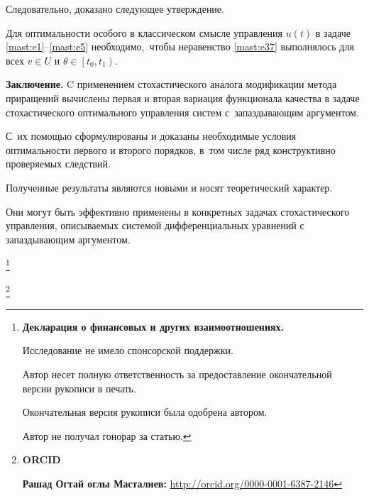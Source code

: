 Следовательно, доказано следующее утверждение.



\smallskip



\begin{theorem}[4]Для оптимальности особого в классическом смысле управления $ u(t) $ в задаче \eqref{mast:e1}--\eqref{mast:e5}  необходимо$,$ чтобы неравенство  \eqref{mast:e37}  выполнялось  для всех  $ v \in U $ и $ \theta \in \left[ t_{0}, t_{1} \right)  .$

\end{theorem}



\smallskip



 

\textbf{Заключение.} C применением стохастического аналога модификации метода приращений вычислены первая и вторая вариация функционала качества в задаче стохастического оптимального управления систем с~запаздывающим аргументом. 

С~их помощью сформулированы и доказаны необходимые условия оптимальности первого и второго порядков, в~том числе ряд конструктивно проверяемых следствий. 

Полученные результаты являются новыми и носят теоретический характер. 

Они могут быть эффективно применены в конкретных  задачах стохастического управления,  описываемых системой дифференциальных уравнений с запаздывающим аргументом.







\thanks{{\bf Декларация о финансовых и других взаимоотношениях.}

Исследование не имело спонсорской поддержки.

Автор несет полную ответственность за предоставление окончательной версии рукописи в печать.

Окончательная версия рукописи была одобрена автором.

Автор не получал гонорар за статью.

}





\thanks{{\bf ORCID}



{\bf  Рашад Огтай оглы Масталиев:}    \url{http://orcid.org/0000-0001-6387-2146}



}




